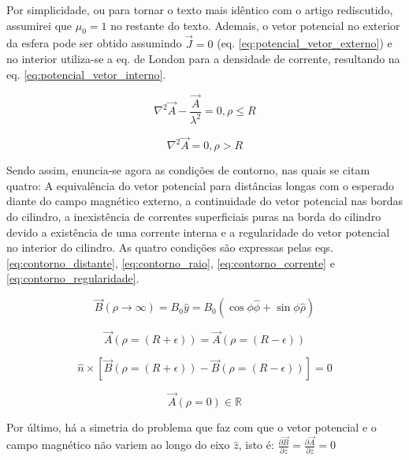 \documentclass[%
 reprint,
 amsmath,amssymb,
 aps,
]{revtex4-1}
\begin{document}
Por simplicidade, ou para tornar o texto mais idêntico com o artigo rediscutido, assumirei que $\mu_0 = 1$ no restante do texto. Ademais, o vetor potencial no exterior da esfera pode ser obtido assumindo $\vec{J}=0$ (eq. \ref{eq:potencial_vetor_externo}) e no interior utiliza-se a eq. de London para a densidade de corrente, resultando na eq. \ref{eq:potencial_vetor_interno}.

\begin{equation}
    \label{eq:potencial_vetor_interno}
    \nabla^2 \vec{A} - \frac{\vec{A}}{\lambda^2} = 0, \rho \leq R
\end{equation}

\begin{equation}
    \label{eq:potencial_vetor_externo}
    \nabla^2 \vec{A} = 0, \rho > R
\end{equation}

Sendo assim, enuncia-se agora as condições de contorno, nas quais se citam quatro: A equivalência do vetor potencial para distâncias longas com o esperado diante do campo magnético externo, a continuidade do vetor potencial nas bordas do cilindro, a inexistência de correntes superficiais puras na borda do cilindro devido a existência de uma corrente interna e a regularidade do vetor potencial no interior do cilindro. As quatro condições são expressas pelas eqs. \ref{eq:contorno_distante}, \ref{eq:contorno_raio}, \ref{eq:contorno_corrente} e \ref{eq:contorno_regularidade}.


\begin{equation}
    \label{eq:contorno_distante}
     \vec{B}(\rho \rightarrow \infty) = B_0 \hat{y} = B_0 (\cos{\phi} \hat{\phi} + \sin{\phi} \hat{\rho})
\end{equation}

\begin{equation}
    \label{eq:contorno_raio}
     \vec{A}(\rho=(R + \epsilon)) = \vec{A}(\rho=(R - \epsilon))
\end{equation}

\begin{equation}
    \label{eq:contorno_corrente}
     \hat{n} \times [\vec{B}(\rho=(R + \epsilon)) - \vec{B}(\rho=(R - \epsilon))] = 0
\end{equation}

\begin{equation}
    \label{eq:contorno_regularidade}
     \vec{A}(\rho = 0) \in \mathbb{R}
\end{equation}

Por último, há a simetria do problema que faz com que o vetor potencial e o campo magnético não variem ao longo do eixo $\hat{z}$, isto é: $\frac{\partial  \vec{B}}{\partial z} = \frac{\partial \vec{A}}{\partial z} = 0$
\end{document}

